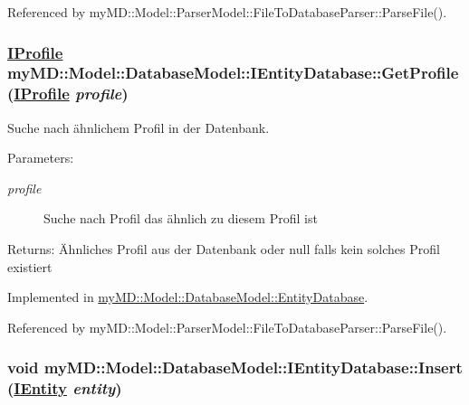 Referenced by my\-MD::Model::Parser\-Model::File\-To\-Database\-Parser::Parse\-File().\hypertarget{interfacemy_m_d_1_1_model_1_1_database_model_1_1_i_entity_database_a22117377d44ffae8e1381d0814d1960}{
\subsubsection[GetProfile]{\setlength{\rightskip}{0pt plus 5cm}\hyperlink{interfacemy_m_d_1_1_model_interface_1_1_data_model_interface_1_1_i_profile}{IProfile} my\-MD::Model::Database\-Model::IEntity\-Database::Get\-Profile (\hyperlink{interfacemy_m_d_1_1_model_interface_1_1_data_model_interface_1_1_i_profile}{IProfile} {\em profile})}}
\label{d3/da9/interfacemy_m_d_1_1_model_1_1_database_model_1_1_i_entity_database_a22117377d44ffae8e1381d0814d1960}


Suche nach \"{a}hnlichem Profil in der Datenbank. 

\begin{Desc}
\item[Parameters:]
\begin{description}
\item[{\em profile}]Suche nach Profil das \"{a}hnlich zu diesem Profil ist\end{description}
\end{Desc}
\begin{Desc}
\item[Returns:]\"{A}hnliches Profil aus der Datenbank oder null falls kein solches Profil existiert\end{Desc}


Implemented in \hyperlink{classmy_m_d_1_1_model_1_1_database_model_1_1_entity_database_a22117377d44ffae8e1381d0814d1960}{my\-MD::Model::Database\-Model::Entity\-Database}.

Referenced by my\-MD::Model::Parser\-Model::File\-To\-Database\-Parser::Parse\-File().\hypertarget{interfacemy_m_d_1_1_model_1_1_database_model_1_1_i_entity_database_71b401e7c809fdda0a0b15b6792e69c8}{
\subsubsection[Insert]{\setlength{\rightskip}{0pt plus 5cm}void my\-MD::Model::Database\-Model::IEntity\-Database::Insert (\hyperlink{interfacemy_m_d_1_1_model_interface_1_1_data_model_interface_1_1_i_entity}{IEntity} {\em entity})}}
\label{d3/da9/interfacemy_m_d_1_1_model_1_1_database_model_1_1_i_entity_database_71b401e7c809fdda0a0b15b6792e69c8}


